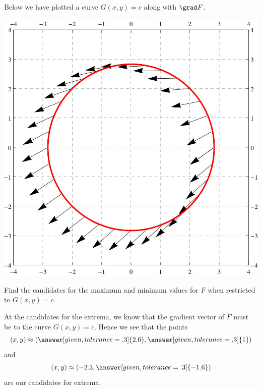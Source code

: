 \documentclass{ximera}
\begin{document}
\begin{example}
  Below we have plotted a curve $G(x,y) = c$ along with $\grad F$.
  \begin{image}
    \includegraphics{curveVectors2.jpg}
  \end{image}
  Find the candidates for the maximum and minimum values for $F$ when
  restricted to $G(x,y) = c$.
  \begin{explanation}
    At the candidates for the extrema, we know that the gradient
    vector of $F$ must be
     to
    the curve $G(x,y) = c$. Hence we see that the points
    \[
    (x,y)\approx\left(\answer[given,tolerance=.3]{2.6},\answer[given,tolerance=.3]{1}\right)
    \]
    and
    \[
    (x,y)\approx \left(-2.3,\answer[given,tolerance=.3]{-1.6}\right)
    \]
    are our candidates for extrema.
  \end{explanation}
\end{example}
\end{document}
